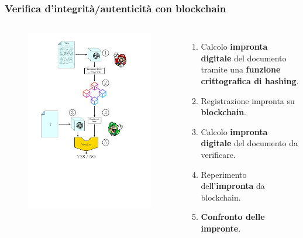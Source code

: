 \documentclass{beamer}
\begin{document}
\begin{frame}
	\frametitle{Verifica d'integrità/autenticità con blockchain}
	\begin{columns}
		\begin{figure}
			\includegraphics[width=\textwidth]{figures/hashsaving2.pdf}
		\end{figure}
		\begin{enumerate}
			\item Calcolo \textbf{impronta digitale} del documento tramite una \textbf{funzione crittografica di hashing}.
			\item Registrazione impronta su \textbf{blockchain}.
			\item Calcolo \textbf{impronta digitale} del documento da verificare.
			\item Reperimento dell'\textbf{impronta} da blockchain.
			\item \textbf{Confronto delle impronte}.
		\end{enumerate}
	\end{columns}
\end{frame}
\end{document}
